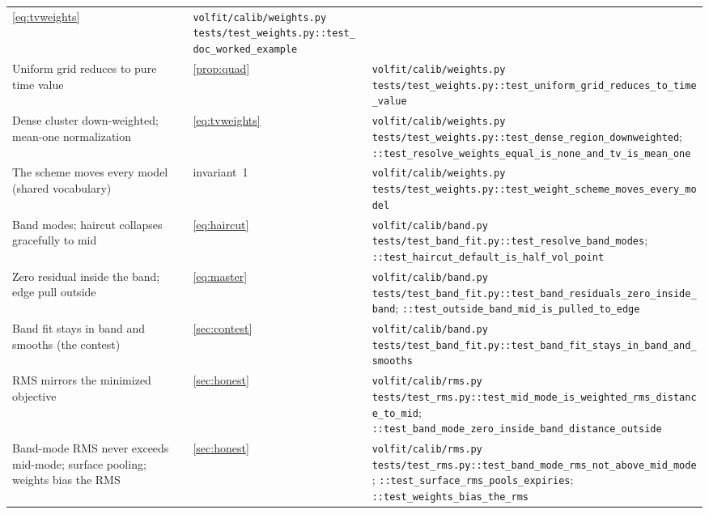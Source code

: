 \documentclass[11pt]{article}
\begin{document}
\begin{longtable}{@{}p{}p{}p{}@{}}
\eqref{eq:tvweights} &
\nolinkurl{volfit/calib/weights.py}\newline
\nolinkurl{tests/test_weights.py::test_doc_worked_example}\\
\addlinespace
Uniform grid reduces to pure time value &
\cref{prop:quad} &
\nolinkurl{volfit/calib/weights.py}\newline
\nolinkurl{tests/test_weights.py::test_uniform_grid_reduces_to_time_value}\\
\addlinespace
Dense cluster down-weighted; mean-one normalization &
\eqref{eq:tvweights} &
\nolinkurl{volfit/calib/weights.py}\newline
\nolinkurl{tests/test_weights.py::test_dense_region_downweighted};
\nolinkurl{::test_resolve_weights_equal_is_none_and_tv_is_mean_one}\\
\addlinespace
The scheme moves every model (shared vocabulary) &
invariant~1 &
\nolinkurl{volfit/calib/weights.py}\newline
\nolinkurl{tests/test_weights.py::test_weight_scheme_moves_every_model}\\
\addlinespace
Band modes; haircut collapses gracefully to mid &
\eqref{eq:haircut} &
\nolinkurl{volfit/calib/band.py}\newline
\nolinkurl{tests/test_band_fit.py::test_resolve_band_modes};
\nolinkurl{::test_haircut_default_is_half_vol_point}\\
\addlinespace
Zero residual inside the band; edge pull outside &
\eqref{eq:master} &
\nolinkurl{volfit/calib/band.py}\newline
\nolinkurl{tests/test_band_fit.py::test_band_residuals_zero_inside_band};
\nolinkurl{::test_outside_band_mid_is_pulled_to_edge}\\
\addlinespace
Band fit stays in band and smooths (the contest) &
\cref{sec:contest} &
\nolinkurl{volfit/calib/band.py}\newline
\nolinkurl{tests/test_band_fit.py::test_band_fit_stays_in_band_and_smooths}\\
\addlinespace
RMS mirrors the minimized objective &
\cref{sec:honest} &
\nolinkurl{volfit/calib/rms.py}\newline
\nolinkurl{tests/test_rms.py::test_mid_mode_is_weighted_rms_distance_to_mid};
\nolinkurl{::test_band_mode_zero_inside_band_distance_outside}\\
\addlinespace
Band-mode RMS never exceeds mid-mode; surface pooling; weights bias the
RMS &
\cref{sec:honest} &
\nolinkurl{volfit/calib/rms.py}\newline
\nolinkurl{tests/test_rms.py::test_band_mode_rms_not_above_mid_mode};
\nolinkurl{::test_surface_rms_pools_expiries};
\nolinkurl{::test_weights_bias_the_rms}\\
\bottomrule
\end{longtable}
\endgroup
\end{document}
